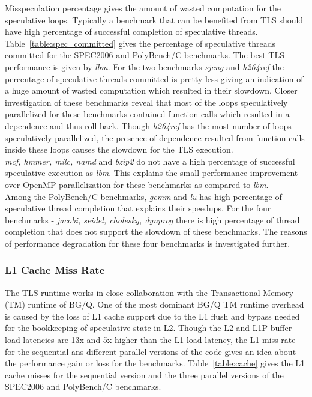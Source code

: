 \documentclass[10pt]{report}          %
\begin{document}
Misspeculation percentage gives the amount of wasted computation for the speculative loops.  Typically a benchmark that can be benefited from TLS should have high percentage of successful completion of speculative threads. Table~\ref{table:spec_committed} gives the percentage of speculative threads committed for the SPEC2006 and PolyBench/C benchmarks.  The best TLS performance is given by \textit{lbm}.  For the two benchmarks \textit{sjeng} and \textit{h264ref} the percentage of speculative threads committed is pretty less giving an indication of a huge amount of wasted computation which resulted in their slowdown.  Closer investigation of these benchmarks reveal that most of the loops speculatively parallelized for these benchmarks contained function calls which resulted in a dependence and thus roll back.  Though \textit{h264ref} has the most number of loops speculatively parallelized, the presence of dependence resulted from function calls inside these loops causes the slowdown for the TLS execution.\\

\textit{mcf, hmmer, milc, namd} and \textit{bzip2} do not have a high percentage of successful speculative execution as \textit{lbm}. This explains the small performance improvement over OpenMP parallelization for these benchmarks as compared to \textit{lbm}. \\

Among the PolyBench/C benchmarks, \textit{gemm} and \textit{lu} has high percentage of speculative thread completion that explains their speedups.  For the four benchmarks - \textit{jacobi, seidel, cholesky, dynprog} there is high percentage of thread completion that does not support the slowdown of these benchmarks.  The reasons of performance degradation for these four benchmarks is investigated further.

\subsubsection{L1 Cache Miss Rate}

The TLS runtime works in close collaboration with the Transactional Memory (TM) runtime of BG/Q.  One of the most dominant BG/Q TM runtime overhead is caused by the loss of L1 cache support due to the L1 flush and bypass needed for the bookkeeping of speculative
state in L2. Though the L2 and L1P buffer load latencies are 13x and 5x higher than the L1 load latency, the L1 miss rate for the sequential ans different parallel versions of the code gives an idea about the performance gain or loss for the benchmarks. Table~\ref{table:cache} gives the L1 cache misses for the sequential version and the three parallel versions of the SPEC2006 and PolyBench/C benchmarks.\\
\end{document}
